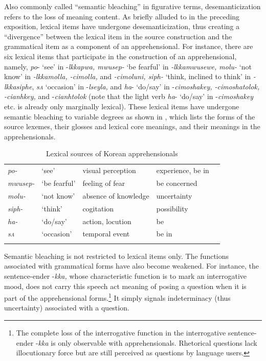 \documentclass[output=paper,colorlinks,citecolor=brown]{langscibook}
\begin{document}
Also commonly called “semantic bleaching” in figurative terms, desemanticization refers to the loss of meaning content. As briefly alluded to in the preceding exposition, lexical items have undergone desemanticization, thus creating a “divergence” \citep{Hopper1991} between the lexical item in the source construction and the grammatical item as a component of an apprehensional. For instance, there are six lexical items that participate in the construction of an apprehensional, namely, \textit{po}- `see' in \nobreakdash-\textit{lkkapwa, mwusep-} `be fearful' in \textit{-lkkamwusewe, molu-} `not know' in \textit{-lkkamolla, -cimolla,} and \textit{-cimoluni, siph-} `think, inclined to think' in \textit{\nobreakdash-lkkasiphe},  \textit{s\textsc{a}} `occasion' in \nobreakdash-\textit{lseyla,} and \textit{ha}- `do/say' in \nobreakdash-\textit{cimoshakey, \nobreakdash-cimoshatolok, \nobreakdash-cianhkey,} and \nobreakdash-\textit{cianhtolok} (note that the light verb \textit{ha}- `do/say' in \nobreakdash-\textit{cimoshakey} etc. is already only marginally lexical). These lexical items have undergone semantic bleaching to variable degrees as shown in , which lists the forms of the source lexemes, their glosses and lexical core meanings, and their meanings in the apprehensionals.

\begin{table}
\begin{tabular}{lllll}
\lsptoprule
\textit{po-} & `see' & visual perception & experience, be in \\
\textit{mwusep-} & `be fearful' & feeling of fear & be concerned \\
\textit{molu-} & `not know' & absence of knowledge & uncertainty \\
\textit{siph-} & `think' & cogitation & possibility \\
\textit{ha-} & `do/say' & action, locution & be \\
\textit{s\textsc{a}} & `occasion' & temporal event & be in\\
\lspbottomrule
\end{tabular}
\caption{Lexical sources of Korean apprehensionals}
\label{tab:gram_sources}
\end{table}


Semantic bleaching is not restricted to lexical items only. The functions associated with grammatical forms have also become weakened. For instance, the sentence-ender \nobreakdash-\textit{kka,} whose characteristic function is to mark an interrogative mood, does not carry this speech act meaning of posing a question when it is part of the apprehensional forms.\footnote{The complete loss of the interrogative function in the interrogative sentence-ender \nobreakdash-\textit{kka} is only observable with apprehensionals. Rhetorical questions lack illocutionary force but are still perceived as questions by language users.} It simply signals indeterminacy (thus uncertainty) associated with a question.
\end{document}
